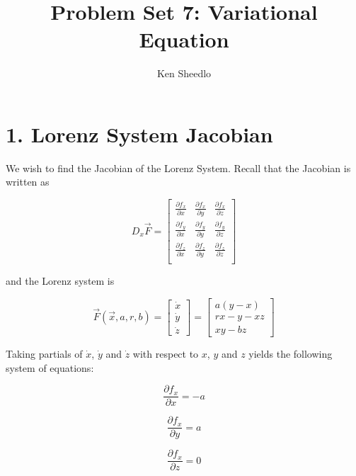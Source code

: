 \documentclass[12pt, letterpaper]{article}
\title{Problem Set 7: Variational Equation}
\author{Ken Sheedlo}
\begin{document}
\maketitle{}

\section*{1. Lorenz System Jacobian}

We wish to find the Jacobian of the Lorenz System. Recall that the Jacobian is
written as 

\begin{equation}
D_x\vec{F} = \left[ \begin{array}{ccc}
\frac{\partial f_x}{\partial x} & \frac{\partial f_x}{\partial y} & 
\frac{\partial f_x}{\partial z} \\ \frac{\partial f_y}{\partial x} & 
\frac{\partial f_y}{\partial y} & \frac{\partial f_y}{\partial z} \\
\frac{\partial f_z}{\partial x} & \frac{\partial f_z}{\partial y} & 
\frac{\partial f_z}{\partial z} \\
\end{array} \right]
\end{equation}

and the Lorenz system is

\begin{equation}
\vec{F}(\vec{x}, a, r, b) = \left[ \begin{array}{c}
\dot{x} \\ \dot{y} \\ \dot{z}
\end{array} \right] = \left[ \begin{array}{c}
a(y-x) \\ rx - y - xz \\ xy - bz
\end{array} \right]
\end{equation}

Taking partials of $\dot{x}$, $\dot{y}$ and $\dot{z}$ with respect to $x$, $y$
and $z$ yields the following system of equations:

\begin{equation}
\frac{\partial f_x}{\partial x} = -a
\end{equation}

\begin{equation}
\frac{\partial f_x}{\partial y} = a
\end{equation}

\begin{equation}
\frac{\partial f_x}{\partial z} = 0
\end{equation}
\end{document}
